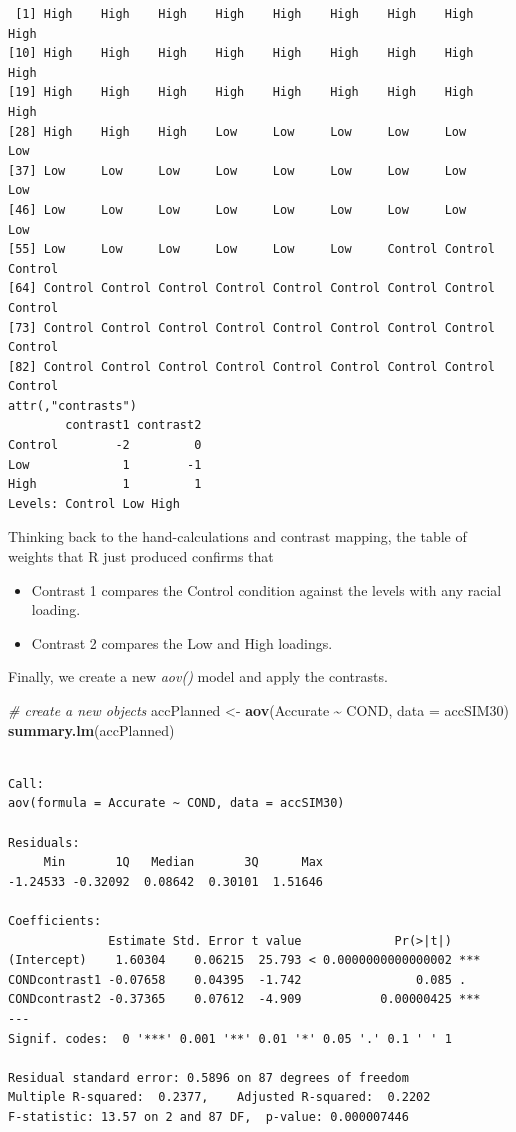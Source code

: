 \documentclass[
  11pt,
]{book}
\newenvironment{Shaded}{\begin{snugshade}}{\end{snugshade}}
\newcommand{\AttributeTok}[1]{\textcolor[rgb]{0.27,0.27,0.27}{#1}}
\newcommand{\CommentTok}[1]{\textcolor[rgb]{0.37,0.37,0.37}{\textit{#1}}}
\newcommand{\FunctionTok}[1]{\textcolor[rgb]{0.27,0.27,0.27}{\textbf{#1}}}
\newcommand{\NormalTok}[1]{#1}
\newcommand{\OtherTok}[1]{\textcolor[rgb]{0.37,0.37,0.37}{#1}}
\newcommand{\SpecialCharTok}[1]{\textcolor[rgb]{0.43,0.43,0.43}{\textbf{#1}}}
\providecommand{\tightlist}{%
  \setlength{\itemsep}{0pt}\setlength{\parskip}{0pt}}
\begin{document}
\begin{verbatim}
 [1] High    High    High    High    High    High    High    High    High   
[10] High    High    High    High    High    High    High    High    High   
[19] High    High    High    High    High    High    High    High    High   
[28] High    High    High    Low     Low     Low     Low     Low     Low    
[37] Low     Low     Low     Low     Low     Low     Low     Low     Low    
[46] Low     Low     Low     Low     Low     Low     Low     Low     Low    
[55] Low     Low     Low     Low     Low     Low     Control Control Control
[64] Control Control Control Control Control Control Control Control Control
[73] Control Control Control Control Control Control Control Control Control
[82] Control Control Control Control Control Control Control Control Control
attr(,"contrasts")
        contrast1 contrast2
Control        -2         0
Low             1        -1
High            1         1
Levels: Control Low High
\end{verbatim}

Thinking back to the hand-calculations and contrast mapping, the table of weights that R just produced confirms that

\begin{itemize}
\tightlist
\item
  Contrast 1 compares the Control condition against the levels with any racial loading.\\
\item
  Contrast 2 compares the Low and High loadings.
\end{itemize}

Finally, we create a new \emph{aov()} model and apply the contrasts.

\begin{Shaded}
\begin{Highlighting}[]
\CommentTok{\# create a new objects}
\NormalTok{accPlanned }\OtherTok{\textless{}{-}} \FunctionTok{aov}\NormalTok{(Accurate }\SpecialCharTok{\textasciitilde{}}\NormalTok{ COND, }\AttributeTok{data =}\NormalTok{ accSIM30)}
\FunctionTok{summary.lm}\NormalTok{(accPlanned)}
\end{Highlighting}
\end{Shaded}

\begin{verbatim}

Call:
aov(formula = Accurate ~ COND, data = accSIM30)

Residuals:
     Min       1Q   Median       3Q      Max 
-1.24533 -0.32092  0.08642  0.30101  1.51646 

Coefficients:
              Estimate Std. Error t value             Pr(>|t|)    
(Intercept)    1.60304    0.06215  25.793 < 0.0000000000000002 ***
CONDcontrast1 -0.07658    0.04395  -1.742                0.085 .  
CONDcontrast2 -0.37365    0.07612  -4.909           0.00000425 ***
---
Signif. codes:  0 '***' 0.001 '**' 0.01 '*' 0.05 '.' 0.1 ' ' 1

Residual standard error: 0.5896 on 87 degrees of freedom
Multiple R-squared:  0.2377,    Adjusted R-squared:  0.2202 
F-statistic: 13.57 on 2 and 87 DF,  p-value: 0.000007446
\end{verbatim}
\end{document}
